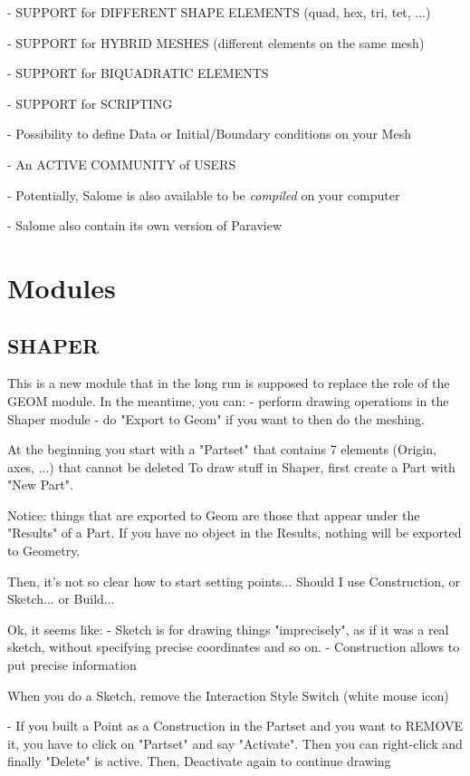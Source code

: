\documentclass[10pt]{book}
\begin{document}
 - {SUPPORT for DIFFERENT SHAPE ELEMENTS (quad, hex, tri, tet, ...)} 

 - {SUPPORT for HYBRID MESHES (different elements on the same mesh)}
    
 - {SUPPORT for BIQUADRATIC ELEMENTS}
    
 - {SUPPORT for SCRIPTING}
  
 - Possibility to define Data or Initial/Boundary conditions on your Mesh 

 - {An ACTIVE COMMUNITY of USERS}

 - Potentially, Salome is also available to be \textit{compiled} on your computer
 
 - Salome also contain its own version of Paraview

 
 
 \section{Modules}

 \subsection{SHAPER}


This is a new module that in the long run is supposed to replace the role of the GEOM module.
In the meantime, you can:
  - perform drawing operations in the Shaper module 
  - do "Export to Geom" if you want to then do the meshing.

At the beginning you start with a "Partset" that contains 7 elements (Origin, axes, ...) that cannot be deleted  
To draw stuff in Shaper, first create a Part with "New Part".

Notice: things that are exported to Geom are those that appear under the "Results" of a Part.
If you have no object in the Results, nothing will be exported to Geometry.

Then, it's not so clear how to start setting points... Should I use Construction, or Sketch... or Build...

Ok, it seems like:
 - Sketch is for drawing things "imprecisely", as if it was a real sketch, without specifying precise coordinates and so on.
 - Construction allows to put precise information

 When you do a Sketch, remove the Interaction Style Switch (white mouse icon)
 
 - If you built a Point as a Construction in the Partset and you want to REMOVE it, you have to click on "Partset" and say "Activate". 
   Then you can right-click and finally "Delete" is active. Then, Deactivate again to continue drawing
\end{document}
